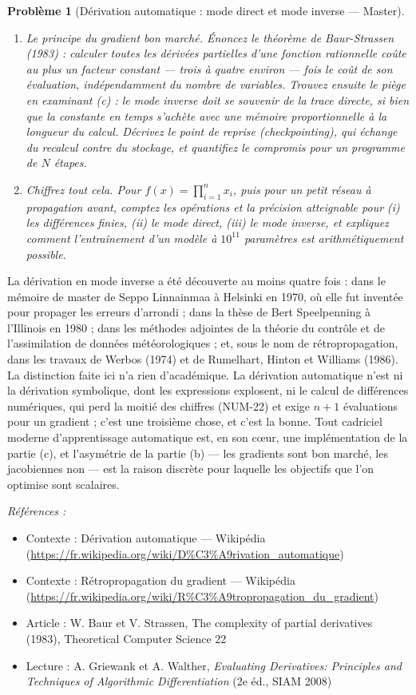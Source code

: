 \documentclass[11pt]{article}
\newtheorem{problem}{Problème}
\newenvironment{refs}{\par\small\noindent\emph{Références :}\begin{itemize}\setlength\itemsep{0pt}}{\end{itemize}\normalsize}
\begin{document}
\begin{problem}[{Dérivation automatique : mode direct et mode inverse --- Master}]
\begin{enumerate}
\item[(d)] Le principe du gradient bon marché. Énoncez le théorème de Baur-Strassen (1983) : calculer toutes les dérivées partielles d'une fonction rationnelle coûte au plus un facteur constant --- trois à quatre environ --- fois le coût de son évaluation, indépendamment du nombre de variables. Trouvez ensuite le piège en examinant (c) : le mode inverse doit se souvenir de la trace directe, si bien que la constante en temps s'achète avec une mémoire proportionnelle à la longueur du calcul. Décrivez le point de reprise (\textit{checkpointing}), qui échange du recalcul contre du stockage, et quantifiez le compromis pour un programme de $N$ étapes.
\item[(e)] Chiffrez tout cela. Pour $f(x) = \prod_{i=1}^{n} x_i$, puis pour un petit réseau à propagation avant, comptez les opérations et la précision atteignable pour (i) les différences finies, (ii) le mode direct, (iii) le mode inverse, et expliquez comment l'entraînement d'un modèle à $10^{11}$ paramètres est arithmétiquement possible.
\end{enumerate}

\end{problem}

\noindent La dérivation en mode inverse a été découverte au moins quatre fois : dans le mémoire de master de Seppo Linnainmaa à Helsinki en 1970, où elle fut inventée pour propager les erreurs d'arrondi ; dans la thèse de Bert Speelpenning à l'Illinois en 1980 ; dans les méthodes adjointes de la théorie du contrôle et de l'assimilation de données météorologiques ; et, sous le nom de rétropropagation, dans les travaux de Werbos (1974) et de Rumelhart, Hinton et Williams (1986). La distinction faite ici n'a rien d'académique. La dérivation automatique n'est ni la dérivation symbolique, dont les expressions explosent, ni le calcul de différences numériques, qui perd la moitié des chiffres (NUM-22) et exige $n+1$ évaluations pour un gradient ; c'est une troisième chose, et c'est la bonne. Tout cadriciel moderne d'apprentissage automatique est, en son c\oe{}ur, une implémentation de la partie (c), et l'asymétrie de la partie (b) --- les gradients sont bon marché, les jacobiennes non --- est la raison discrète pour laquelle les objectifs que l'on optimise sont scalaires.

\begin{refs}
\item Contexte : Dérivation automatique --- Wikipédia (\url{https://fr.wikipedia.org/wiki/D%C3%A9rivation_automatique})
\item Contexte : Rétropropagation du gradient --- Wikipédia (\url{https://fr.wikipedia.org/wiki/R%C3%A9tropropagation_du_gradient})
\item Article : W. Baur et V. Strassen, \og{} The complexity of partial derivatives \fg{} (1983), Theoretical Computer Science 22
\item Lecture : A. Griewank et A. Walther, \textit{Evaluating Derivatives: Principles and Techniques of Algorithmic Differentiation} (2e éd., SIAM 2008)
\end{refs}
\end{document}
